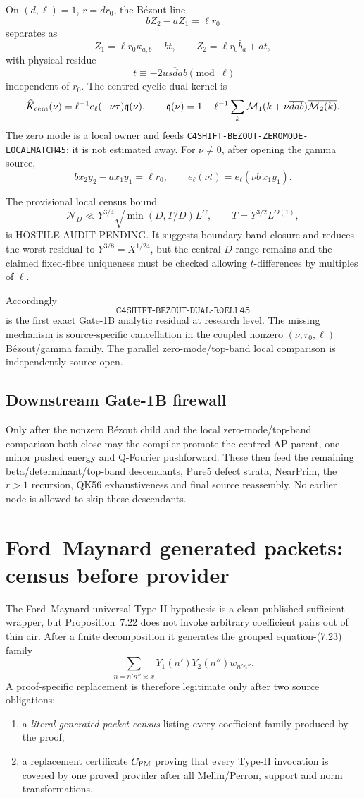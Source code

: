 \documentclass[11pt]{article}
\theoremstyle{definition}
\newcommand{\1}{\mathbf 1}
\newcommand{\status}[1]{\textsf{#1}}
\begin{document}
On $(d,\ell)=1$, $r=dr_0$, the B\'ezout line
\[
bZ_2-aZ_1=\ell r_0
\]
separates as
\[
Z_1=\ell r_0\kappa_{a,b}+bt,
\qquad
Z_2=\ell r_0\bar b_a+at,
\]
with physical residue
\[
t\equiv-2\overline{usdab}\pmod\ell
\]
independent of $r_0$.  The centred cyclic dual kernel is
\[
\widehat K_{\rm cent}(\nu)
=
\ell^{-1}e_\ell(-\nu\tau)\mathfrak q(\nu),
\qquad
\mathfrak q(\nu)=1-\ell^{-1}\sum_k
\mathcal M_1(k+\nu\overline{dab})\overline{\mathcal M_2(k)}.
\]
The zero mode is a local owner and feeds
\texttt{C4SHIFT-BEZOUT-ZEROMODE-LOCALMATCH45}; it is not estimated away.  For
$\nu\ne0$, after opening the gamma source,
\[
bx_2y_2-a x_1y_1=\ell r_0,
\qquad
 e_\ell(\nu t)=e_\ell(\nu\bar b\,x_1y_1).
\]

The provisional local census bound
\[
\mathcal N_D\ll Y^{3/4}\sqrt{\min(D,T/D)}L^C,
\qquad T=Y^{3/2}L^{O(1)},
\]
is \status{HOSTILE-AUDIT PENDING}.  It suggests boundary-band closure and reduces the
worst residual to $Y^{3/8}=X^{1/24}$, but the central $D$ range remains and the claimed
fixed-fibre uniqueness must be checked allowing $t$-differences by multiples of $\ell$.

Accordingly
\[
\boxed{\texttt{C4SHIFT-BEZOUT-DUAL-R0ELL45}}
\]
is the first exact Gate-1B analytic residual at research level.  The missing mechanism is
source-specific cancellation in the coupled nonzero $(\nu,r_0,\ell)$ B\'ezout/gamma
family.  The parallel zero-mode/top-band local comparison is independently source-open.

\subsection{Downstream Gate-1B firewall}
Only after the nonzero B\'ezout child and the local zero-mode/top-band comparison both
close may the compiler promote the centred-AP parent, one-minor pushed energy and
Q-Fourier pushforward.  These then feed the remaining beta/determinant/top-band descendants,
Pure5 defect strata, NearPrim, the $r>1$ recursion, QK56 exhaustiveness and final source
reassembly.  No earlier node is allowed to skip these descendants.

\section{Ford--Maynard generated packets: census before provider}
\label{sec:ford-census}

The Ford--Maynard universal Type-II hypothesis is a clean published sufficient wrapper,
but Proposition~7.22 does not invoke arbitrary coefficient pairs out of thin air.  After a
finite decomposition it generates the grouped equation-(7.23) family
\[
\sum_{n=n'n''\asymp x}Y_1(n')Y_2(n'')w_{n'n''}.
\]
A proof-specific replacement is therefore legitimate only after two source obligations:
\begin{enumerate}[leftmargin=1.7em]
\item a \emph{literal generated-packet census} listing every coefficient family produced by
  the proof;
\item a replacement certificate $C_{\rm FM}$ proving that every Type-II invocation is
  covered by one proved provider after all Mellin/Perron, support and norm transformations.
\end{enumerate}
\end{document}
